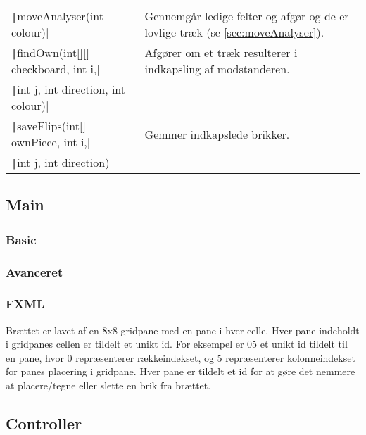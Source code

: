 \begin{table}[H]
\begin{tabular}{ll}
        \texttt|moveAnalyser(int colour)|                   & Gennemgår ledige felter og afgør og de er lovlige træk (se \cref{sec:moveAnalyser}). \\
        \texttt|findOwn(int[][] checkboard, int i,|         & Afgører om et træk resulterer i indkapsling af modstanderen.                         \\
        \quad \texttt|int j, int direction, int colour)|    &                                                                                      \\
        \texttt|saveFlips(int[] ownPiece, int i,|           & Gemmer indkapslede brikker.                                                          \\
        \quad \texttt|int j, int direction)|                &                                                                                      \\
        \bottomrule
    \end{tabular}
\end{table}

\subsection{Main}

\subsubsection{Basic}

\subsubsection{Avanceret}

\subsubsection{FXML}\label{BD}
Brættet er lavet af en 8x8 gridpane med en pane i hver celle. Hver pane indeholdt i gridpanes cellen er tildelt et unikt id. For eksempel er 05 et unikt id tildelt til en pane, hvor 0 repræsenterer rækkeindekset, og 5 repræsenterer kolonneindekset for panes placering i gridpane. Hver pane er tildelt et id for at gøre det nemmere at placere/tegne eller slette en brik fra brættet.


\subsection{Controller}

